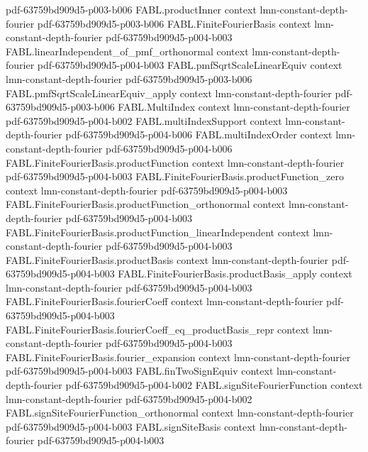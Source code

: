 \begin{theorem}
  {pdf-63759bd909d5-p003-b006}
\proofstep
  {FABL.productInner}
  {context}
  {lmn-constant-depth-fourier}
  {pdf-63759bd909d5-p003-b006}
\proofstep
  {FABL.FiniteFourierBasis}
  {context}
  {lmn-constant-depth-fourier}
  {pdf-63759bd909d5-p004-b003}
\proofstep
  {FABL.linearIndependent_of_pmf_orthonormal}
  {context}
  {lmn-constant-depth-fourier}
  {pdf-63759bd909d5-p004-b003}
\proofstep
  {FABL.pmfSqrtScaleLinearEquiv}
  {context}
  {lmn-constant-depth-fourier}
  {pdf-63759bd909d5-p003-b006}
\proofstep
  {FABL.pmfSqrtScaleLinearEquiv_apply}
  {context}
  {lmn-constant-depth-fourier}
  {pdf-63759bd909d5-p003-b006}
\proofstep
  {FABL.MultiIndex}
  {context}
  {lmn-constant-depth-fourier}
  {pdf-63759bd909d5-p004-b002}
\proofstep
  {FABL.multiIndexSupport}
  {context}
  {lmn-constant-depth-fourier}
  {pdf-63759bd909d5-p004-b006}
\proofstep
  {FABL.multiIndexOrder}
  {context}
  {lmn-constant-depth-fourier}
  {pdf-63759bd909d5-p004-b006}
\proofstep
  {FABL.FiniteFourierBasis.productFunction}
  {context}
  {lmn-constant-depth-fourier}
  {pdf-63759bd909d5-p004-b003}
\proofstep
  {FABL.FiniteFourierBasis.productFunction_zero}
  {context}
  {lmn-constant-depth-fourier}
  {pdf-63759bd909d5-p004-b003}
\proofstep
  {FABL.FiniteFourierBasis.productFunction_orthonormal}
  {context}
  {lmn-constant-depth-fourier}
  {pdf-63759bd909d5-p004-b003}
\proofstep
  {FABL.FiniteFourierBasis.productFunction_linearIndependent}
  {context}
  {lmn-constant-depth-fourier}
  {pdf-63759bd909d5-p004-b003}
\proofstep
  {FABL.FiniteFourierBasis.productBasis}
  {context}
  {lmn-constant-depth-fourier}
  {pdf-63759bd909d5-p004-b003}
\proofstep
  {FABL.FiniteFourierBasis.productBasis_apply}
  {context}
  {lmn-constant-depth-fourier}
  {pdf-63759bd909d5-p004-b003}
\proofstep
  {FABL.FiniteFourierBasis.fourierCoeff}
  {context}
  {lmn-constant-depth-fourier}
  {pdf-63759bd909d5-p004-b003}
\proofstep
  {FABL.FiniteFourierBasis.fourierCoeff_eq_productBasis_repr}
  {context}
  {lmn-constant-depth-fourier}
  {pdf-63759bd909d5-p004-b003}
\proofstep
  {FABL.FiniteFourierBasis.fourier_expansion}
  {context}
  {lmn-constant-depth-fourier}
  {pdf-63759bd909d5-p004-b003}
\proofstep
  {FABL.finTwoSignEquiv}
  {context}
  {lmn-constant-depth-fourier}
  {pdf-63759bd909d5-p004-b002}
\proofstep
  {FABL.signSiteFourierFunction}
  {context}
  {lmn-constant-depth-fourier}
  {pdf-63759bd909d5-p004-b002}
\proofstep
  {FABL.signSiteFourierFunction_orthonormal}
  {context}
  {lmn-constant-depth-fourier}
  {pdf-63759bd909d5-p004-b003}
\proofstep
  {FABL.signSiteBasis}
  {context}
  {lmn-constant-depth-fourier}
  {pdf-63759bd909d5-p004-b003}

\end{theorem}

